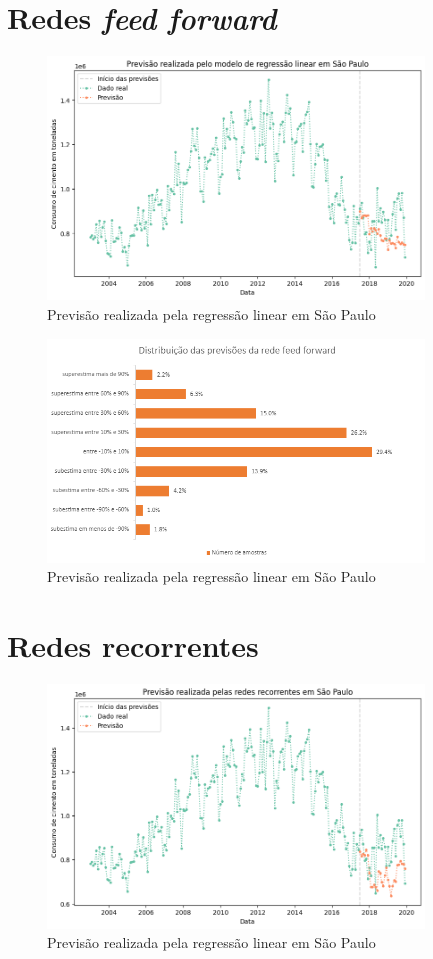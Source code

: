 \section{Redes \textit{feed forward}}

\begin{figure}[H]
    \centering
    \includegraphics[width=10cm]{../figuras/graficos/mlp/prev_sp.png}
    \caption{Previsão realizada pela regressão linear em São Paulo}
    \label{consumo-sp}
\end{figure}

\begin{figure}[H]
    \centering
    \includegraphics[width=10cm]{../figuras/graficos/mlp/erro-perc-mlp.png}
    \caption{Previsão realizada pela regressão linear em São Paulo}
    \label{consumo-sp}
\end{figure}


\section{Redes recorrentes}

\begin{figure}[H]
    \centering
    \includegraphics[width=10cm]{../figuras/graficos/rnn/prev_sp.png}
    \caption{Previsão realizada pela regressão linear em São Paulo}
    \label{consumo-sp}
\end{figure}

